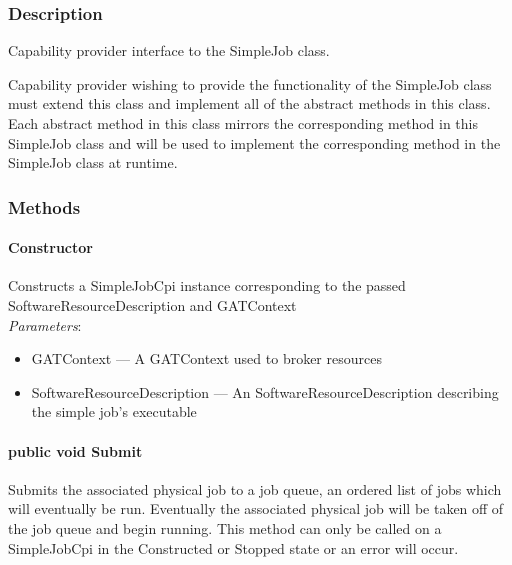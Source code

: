 \documentclass[$Date: 2003/06/26 19:29:31 $]{glabarticle}
\begin{document}

\subsubsection{Description}

Capability provider interface to the SimpleJob class.

Capability provider wishing to provide the functionality of the SimpleJob class must extend this class and
implement all of the abstract methods in this class. Each abstract method in this class mirrors the
corresponding method in this SimpleJob class and will be used to implement the corresponding method in
the SimpleJob class at runtime. 


\subsubsection{Methods}

\paragraph{Constructor}

Constructs a SimpleJobCpi instance corresponding to the passed
SoftwareResourceDescription and GATContext\\

\textit{Parameters}:
\begin{itemize}
\item[] GATContext --- A GATContext used to broker resources
\item[] SoftwareResourceDescription --- An SoftwareResourceDescription describing the simple job's executable
\end{itemize}

\paragraph{public void Submit}

Submits the associated physical job to a job queue, an ordered list of
jobs which will eventually be run. Eventually the associated physical
job will be taken off of the job queue and begin running. This method
can only be called on a SimpleJobCpi in the Constructed or Stopped state or 
an error will occur. \\
\end{document}
